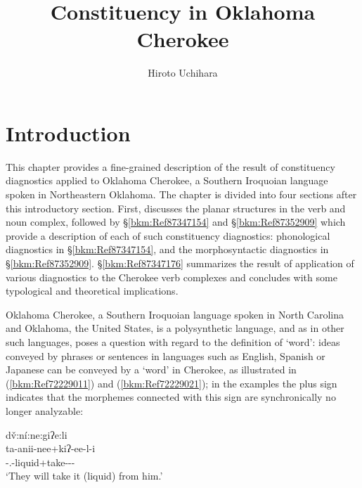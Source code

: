 \documentclass[output=paper]{langscibook}
\author{Hiroto Uchihara\affiliation{Tokyo University of Foreign Studies}}
\title{Constituency in Oklahoma Cherokee}
\begin{document}
\maketitle 

\section{Introduction}

This chapter provides a fine-grained description of the result of constituency diagnostics applied to Oklahoma Cherokee, a Southern Iroquoian language spoken in Northeastern Oklahoma. The chapter is divided into four sections after this introductory section. First,  discusses the planar structures in the verb and noun complex, followed by §\ref{bkm:Ref87347154} and §\ref{bkm:Ref87352909} which provide a description of each of such constituency diagnostics: phonological diagnostics in §\ref{bkm:Ref87347154}, and the morphosyntactic diagnostics in §\ref{bkm:Ref87352909}. §\ref{bkm:Ref87347176} summarizes the result of application of various diagnostics to the Cherokee verb complexes and concludes with some typological and theoretical implications. 

Oklahoma Cherokee, a Southern Iroquoian language spoken in North Carolina and Oklahoma, the United States, is a polysynthetic language, and as in other such languages, poses a question with regard to the definition of `word': ideas conveyed by phrases or sentences in languages such as English, Spanish or Japanese can be conveyed by a `word' in Cherokee, as illustrated in (\ref{bkm:Ref72229011}) and (\ref{bkm:Ref72229021}); in the examples the plus sign indicates that the morphemes connected with this sign are synchronically no longer analyzable:

\ea\label{bkm:Ref72229011}  d\v{v}:ní:ne:giʔe:li\protect\footnotemark\\
    \gll ta-anii-nee+kiʔ-ee-l-i \\
     \Cisl{}-\Third\Sg{}.\Aarg{}-liquid+take-\Dat{}-\Prf{}-\Mot{} \\
     \glt `They will take it (liquid) from him.'  \citep[206]{FeelingEtAl2003}
\z

\end{document}
